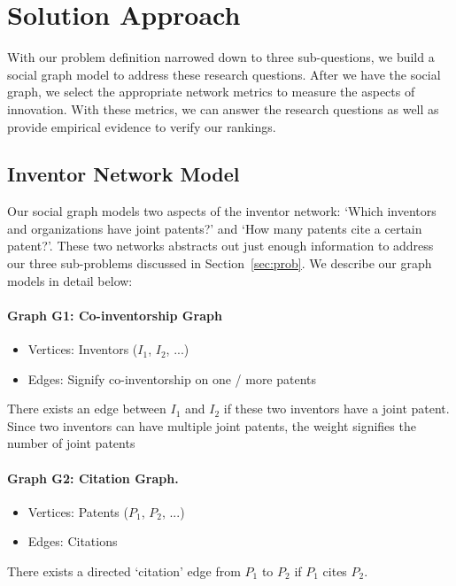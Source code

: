 \section{Solution Approach}
\label{sec:sol}
With our problem definition narrowed down to three sub-questions, we build a social graph model to address these research questions. 
After we have the social graph, we select the appropriate network metrics to measure the aspects of innovation.
With these metrics, we can answer the research questions as well as provide empirical evidence to verify our rankings.

\subsection{Inventor Network Model}
\label{sec:model}
Our social graph models two aspects of the inventor network:  `Which inventors
and organizations have joint patents?' and `How many patents cite a certain
patent?'. These two networks abstracts out just enough information to address
our three sub-problems discussed in Section~\ref{sec:prob}. We describe our graph models in detail below:

\paragraph{Graph G1: Co-inventorship Graph}

	\begin{itemize}
		\item {Vertices:} Inventors  ($I_1$, $I_2$, ...)
		\item {Edges:} Signify co-inventorship on one / more patents
	\end{itemize}

There exists an edge between $I_1$ and $I_2$ if these two inventors have a
joint patent. Since two inventors can have multiple joint patents, the weight
signifies the number of joint patents

\paragraph{Graph G2: Citation Graph.}

	\begin{itemize}
		\item {Vertices:} Patents ($P_1$, $P_2$, ...)
		\item {Edges:} Citations 
	\end{itemize}

There exists a directed `citation' edge from $P_1$ to $P_2$ if $P_1$ cites $P_2$.

